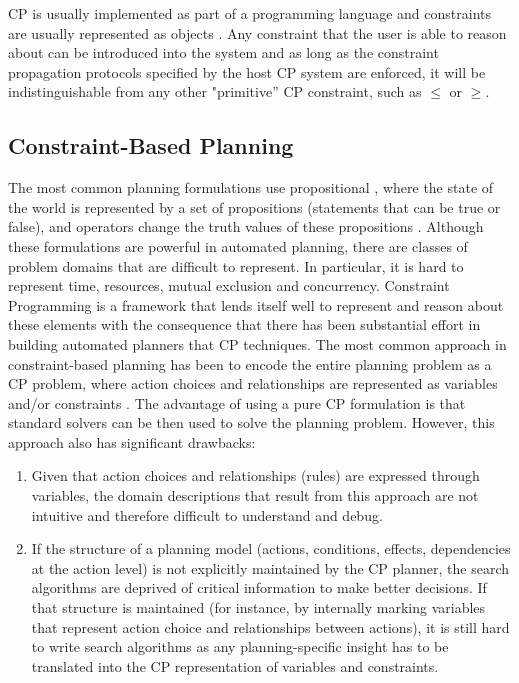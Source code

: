 {\textsf{CP} is usually implemented as part of a programming language
and constraints are usually represented as objects \cite{puget95}. Any
constraint that the user is able to reason about can be introduced
into the system and as long as the constraint propagation protocols
specified by the host \textsf{CP} system are enforced, it will be
indistinguishable from any other "primitive'' \textsf{CP} constraint,
such as $\leq$ or $\geq$.


\subsection{Constraint-Based Planning}
\label{sec:europa:cp}

The most common planning formulations use propositional
, where the state of the world is represented by a set
of propositions (statements that can be true or false), and operators
change the truth values of these propositions \cite{gen87}. Although
these formulations are powerful 
in automated planning, there are classes of problem domains that are
difficult to represent. In particular, it is hard to represent time,
resources, mutual exclusion and concurrency.  Constraint Programming
is a framework that lends itself well to represent and reason about
these elements \cite{ghallab94} with the consequence that there has
been substantial effort in building automated planners that
 \textsf{CP} techniques.  The most common approach
in constraint-based planning has been to encode the entire planning
problem as a \textsf{CP} problem, where action choices and
relationships are represented as variables and/or constraints
\cite{do01,vanbeek99,vossen99,wolfman99}.  The advantage of using a
pure \textsf{CP} formulation is that standard solvers can be then used
to solve the planning problem. However, this approach also has
significant drawbacks:

\begin{enumerate} 

\item Given that action choices and relationships (rules) are
  expressed through variables, the domain descriptions that result
  from this approach are not intuitive and therefore difficult to
  understand and debug.

\item If the structure of a planning model (actions, conditions,
  effects, dependencies at the action level) is not explicitly
  maintained by the \textsf{CP} planner, the search algorithms are
  deprived of critical information to make better decisions. If that
  structure is maintained (for instance, by internally marking
  variables that represent action choice and relationships between
  actions), it is still hard to write search algorithms as any
  planning-specific insight has to be translated into the \textsf{CP}
  representation of variables and constraints.
  

\end{enumerate}}
